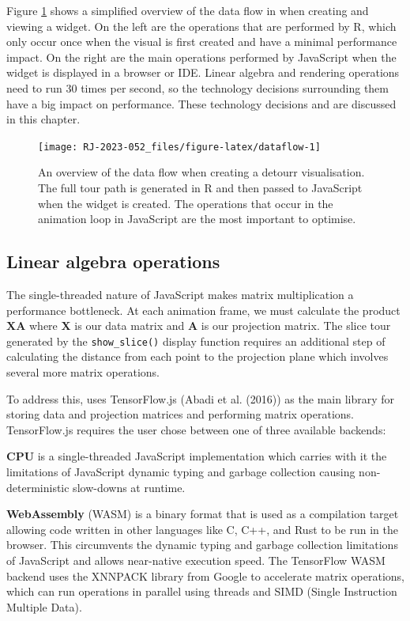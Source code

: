 Figure \ref{fig:dataflow} shows a simplified overview of the data flow in  when creating and viewing a widget. On the left are the operations that are performed by R, which only occur once when the visual is first created and have a minimal performance impact. On the right are the main operations performed by JavaScript when the widget is displayed in a browser or IDE. Linear algebra and rendering operations need to run 30 times per second, so the technology decisions surrounding them have a big impact on performance. These technology decisions and are discussed in this chapter.

\begin{figure}
\texttt{[image: RJ-2023-052\_files/figure-latex/dataflow-1]} \caption{An overview of the data flow when creating a detourr visualisation. The full tour path is generated in R and then passed to JavaScript when the widget is created. The operations that occur in the animation loop in JavaScript are the most important to optimise.}\label{fig:dataflow}
\end{figure}

\hypertarget{linear-algebra-operations}{%
\subsection{Linear algebra operations}\label{linear-algebra-operations}}

The single-threaded nature of JavaScript makes matrix multiplication a performance bottleneck. At each animation frame, we must calculate the product \(\mathbf{XA}\) where \(\mathbf{X}\) is our data matrix and \(\mathbf{A}\) is our projection matrix. The slice tour generated by the \texttt{show\_slice()} display function requires an additional step of calculating the distance from each point to the projection plane which involves several more matrix operations.

To address this,  uses TensorFlow.js (Abadi et al. (2016)) as the main library for storing data and projection matrices and performing matrix operations. TensorFlow.js requires the user chose between one of three available backends:

\textbf{CPU} is a single-threaded JavaScript implementation which carries with it the limitations of JavaScript dynamic typing and garbage collection causing non-deterministic slow-downs at runtime.

\textbf{WebAssembly} (WASM) is a binary format that is used as a compilation target allowing code written in other languages like C, C++, and Rust to be run in the browser. This circumvents the dynamic typing and garbage collection limitations of JavaScript and allows near-native execution speed. The TensorFlow WASM backend uses the XNNPACK library from Google to accelerate matrix operations, which can run operations in parallel using threads and SIMD (Single Instruction Multiple Data).

